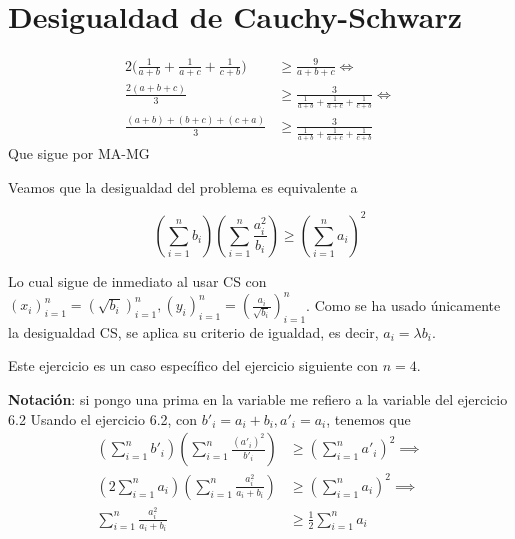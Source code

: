 \section{Desigualdad de Cauchy-Schwarz}

\begin{sol}
	\begin{align}
	2\bigg(\frac{1}{a+b}+\frac{1}{a+c}+\frac{1}{c+b}\bigg) &\geq \frac{9}{a+b+c} \iff \\
	\frac{2(a+b+c)}{3} &\geq \frac{3}{\frac{1}{a+b}+\frac{1}{a+c}+\frac{1}{c+b}} \iff \\
	\frac{(a+b)+(b+c)+(c+a)}{3} &\geq \frac{3}{\frac{1}{a+b}+\frac{1}{a+c}+\frac{1}{c+b}}
	\end{align}
	Que sigue por MA-MG
\end{sol}

\begin{sol}
	Veamos que la desigualdad del problema es equivalente a
	\begin{center}
		$$ (\sum_{i=1}^{n} b_{i})(\sum_{i=1}^{n} \frac{a_{i}^{2}}{b_{i}})\geq (\sum_{i=1}^{n} a_{i})^{2} $$
	\end{center}
	
	Lo cual sigue de inmediato al usar CS con $(x_{i})_{i=1}^{n} = (\sqrt{b_{i}})_{i=1}^{n}, (y_{i})_{i=1}^{n} = (\frac{a_{i}}{\sqrt{b_{i}}})_{i=1}^{n}$. Como se ha usado \'unicamente la desigualdad CS, se aplica su criterio de igualdad, es decir, $a_{i} = \lambda b_{i}$.
\end{sol}

\begin{sol}
	Este ejercicio es un caso espec\'ifico del ejercicio siguiente con $n =4$.
\end{sol}

\begin{sol}
	\textbf{Notaci\'on}: si pongo una prima en la variable me refiero a la variable del ejercicio 6.2
	Usando el ejercicio 6.2, con $b'_{i} = a_{i} +b_{i}, a'_{i} = a_{i}$, tenemos que
	\begin{align}
		 \left(\sum_{i=1}^{n} b'_{i}\right)\left(\sum_{i=1}^{n} \frac{\left(a'_{i}\right)^{2}}{b'_{i}}\right)&\geq \left(\sum_{i=1}^{n} a'_{i}\right)^{2}  \implies \\		 
		 \left(2\sum_{i=1}^{n} a_{i}\right)\left(\sum_{i=1}^{n} \frac{a_{i}^{2}}{a_{i} + b_{i}}\right)&\geq \left(\sum_{i=1}^{n} a_{i}\right)^{2} \implies \\
		 \sum_{i=1}^{n} \frac{a_{i}^{2}}{a_{i} + b_{i}} &\geq \frac{1}{2}\sum_{i=1}^{n} a_{i}
	\end{align}
\end{sol}


